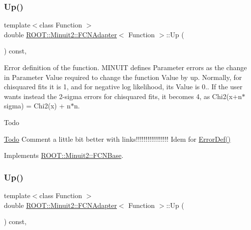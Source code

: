 \subsubsection{\texorpdfstring{Up()}{Up()}\hspace{0.1cm}{\footnotesize\ttfamily [2/3]}}
{\footnotesize\ttfamily template$<$class Function $>$ \\
double \mbox{\hyperlink{classROOT_1_1Minuit2_1_1FCNAdapter}{R\+O\+O\+T\+::\+Minuit2\+::\+F\+C\+N\+Adapter}}$<$ Function $>$\+::Up (\begin{DoxyParamCaption}{ }\end{DoxyParamCaption}) const\hspace{0.3cm}{\ttfamily [inline]}, {\ttfamily [virtual]}}

Error definition of the function. M\+I\+N\+U\+IT defines Parameter errors as the change in Parameter Value required to change the function Value by up. Normally, for chisquared fits it is 1, and for negative log likelihood, its Value is 0.. If the user wants instead the 2-\/sigma errors for chisquared fits, it becomes 4, as Chi2(x+n$\ast$sigma) = Chi2(x) + n$\ast$n.

\begin{DoxyRefDesc}{Todo}
\item[\mbox{\hyperlink{todo__todo000001}{Todo}}]Comment a little bit better with links!!!!!!!!!!!!!!!!! Idem for \mbox{\hyperlink{classROOT_1_1Minuit2_1_1FCNBase_ac4592475c58a65b037ba97ab5f3cba10}{Error\+Def()}}\end{DoxyRefDesc}


Implements \mbox{\hyperlink{classROOT_1_1Minuit2_1_1FCNBase_a04ef08ddad92ce8d89d498efbe021c39}{R\+O\+O\+T\+::\+Minuit2\+::\+F\+C\+N\+Base}}.

\mbox{\label{classROOT_1_1Minuit2_1_1FCNAdapter_a3bcb29efda3b97c17bb17512c1629365}} 
\subsubsection{\texorpdfstring{Up()}{Up()}\hspace{0.1cm}{\footnotesize\ttfamily [3/3]}}
{\footnotesize\ttfamily template$<$class Function $>$ \\
double \mbox{\hyperlink{classROOT_1_1Minuit2_1_1FCNAdapter}{R\+O\+O\+T\+::\+Minuit2\+::\+F\+C\+N\+Adapter}}$<$ Function $>$\+::Up (\begin{DoxyParamCaption}{ }\end{DoxyParamCaption}) const\hspace{0.3cm}{\ttfamily [inline]}, {\ttfamily [virtual]}}

